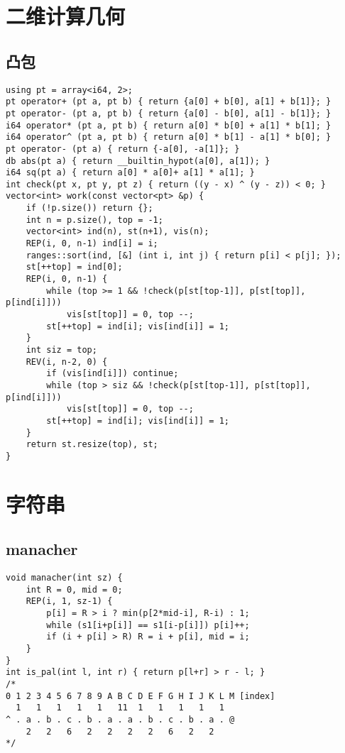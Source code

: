 \documentclass[a4paper,landscape,twocolumn]{ctexart}
\begin{document}
\section{二维计算几何}

\subsection{凸包}

\begin{lstlisting}
using pt = array<i64, 2>;
pt operator+ (pt a, pt b) { return {a[0] + b[0], a[1] + b[1]}; }
pt operator- (pt a, pt b) { return {a[0] - b[0], a[1] - b[1]}; }
i64 operator* (pt a, pt b) { return a[0] * b[0] + a[1] * b[1]; }
i64 operator^ (pt a, pt b) { return a[0] * b[1] - a[1] * b[0]; }
pt operator- (pt a) { return {-a[0], -a[1]}; }
db abs(pt a) { return __builtin_hypot(a[0], a[1]); }
i64 sq(pt a) { return a[0] * a[0]+ a[1] * a[1]; }
int check(pt x, pt y, pt z) { return ((y - x) ^ (y - z)) < 0; }
vector<int> work(const vector<pt> &p) {
	if (!p.size()) return {};
	int n = p.size(), top = -1;
	vector<int> ind(n), st(n+1), vis(n);
	REP(i, 0, n-1) ind[i] = i;
	ranges::sort(ind, [&] (int i, int j) { return p[i] < p[j]; });
	st[++top] = ind[0];
	REP(i, 0, n-1) {
		while (top >= 1 && !check(p[st[top-1]], p[st[top]], p[ind[i]]))
			vis[st[top]] = 0, top --;
		st[++top] = ind[i]; vis[ind[i]] = 1;
	}
	int siz = top;
	REV(i, n-2, 0) {
		if (vis[ind[i]]) continue;
		while (top > siz && !check(p[st[top-1]], p[st[top]], p[ind[i]]))
			vis[st[top]] = 0, top --;
		st[++top] = ind[i]; vis[ind[i]] = 1;
	}
	return st.resize(top), st;
}
\end{lstlisting}

\section{字符串}

\subsection{manacher}

\begin{lstlisting}
void manacher(int sz) {
	int R = 0, mid = 0;
	REP(i, 1, sz-1) {
		p[i] = R > i ? min(p[2*mid-i], R-i) : 1;
		while (s1[i+p[i]] == s1[i-p[i]]) p[i]++;
		if (i + p[i] > R) R = i + p[i], mid = i;
	}
}
int is_pal(int l, int r) { return p[l+r] > r - l; }
/*
0 1 2 3 4 5 6 7 8 9 A B C D E F G H I J K L M [index]
  1   1   1   1   1   11  1   1   1   1   1
^ . a . b . c . b . a . a . b . c . b . a . @
    2   2   6   2   2   2   2   6   2   2
*/
\end{lstlisting}
\end{document}

